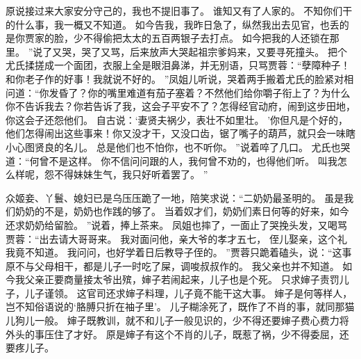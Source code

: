 原说接过来大家安分守己的，我也不提旧事了。
谁知又有了人家的。
不知你们干的什么事，我一概又不知道。
如今告我，我昨日急了，纵然我出去见官，也丢的是你贾家的脸，少不得偷把太太的五百两银子去打点。
如今把我的人还锁在那里。
”说了又哭，哭了又骂，后来放声大哭起祖宗爹妈来，又要寻死撞头。
把个尤氏揉搓成一个面团，衣服上全是眼泪鼻涕，并无别语，只骂贾蓉：“孽障种子！和你老子作的好事！我就说不好的。
”凤姐儿听说，哭着两手搬着尤氏的脸紧对相问道：“你发昏了？你的嘴里难道有茄子塞着？不然他们给你嚼子衔上了？为什么你不告诉我去？你若告诉了我，这会子平安不了？怎得经官动府，闹到这步田地，你这会子还怨他们。
自古说：‘妻贤夫祸少，表壮不如里壮。
’你但凡是个好的，他们怎得闹出这些事来！你又没才干，又没口齿，锯了嘴子的葫芦，就只会一味瞎小心图贤良的名儿。
总是他们也不怕你，也不听你。
”说着啐了几口。
尤氏也哭道：“何曾不是这样。
你不信问问跟的人，我何曾不劝的，也得他们听。
叫我怎么样呢，怨不得妹妹生气，我只好听着罢了。
”\par
众姬妾、丫鬟、媳妇已是乌压压跪了一地，陪笑求说：“二奶奶最圣明的。
虽是我们奶奶的不是，奶奶也作践的够了。
当着奴才们，奶奶们素日何等的好来，如今还求奶奶给留脸。
”说着，捧上茶来。
凤姐也摔了，一面止了哭挽头发，又喝骂贾蓉：“出去请大哥哥来。
我对面问他，亲大爷的孝才五七，
侄儿娶亲，这个礼我竟不知道。
我问问，也好学着日后教导子侄的。
”贾蓉只跪着磕头，说：“这事原不与父母相干，都是儿子一时吃了屎，调唆叔叔作的。
我父亲也并不知道。
如今我父亲正要商量接太爷出殡，婶子若闹起来，儿子也是个死。
只求婶子责罚儿子，儿子谨领。
这官司还求婶子料理，儿子竟不能干这大事。
婶子是何等样人，岂不知俗语说的‘胳膊只折在袖子里’。
儿子糊涂死了，既作了不肖的事，就同那猫儿狗儿一般。
婶子既教训，就不和儿子一般见识的，少不得还要婶子费心费力将外头的事压住了才好。
原是婶子有这个不肖的儿子，既惹了祸，少不得委屈，还要疼儿子。
